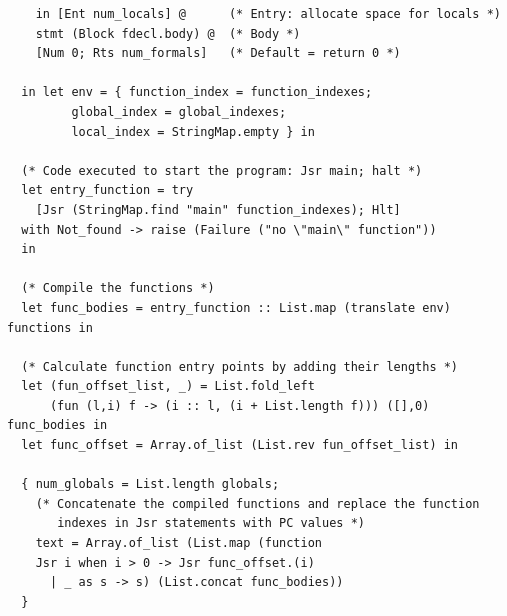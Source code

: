 \documentclass[12pt,A4]{book}
\begin{document}
\begin{verbatim}
    in [Ent num_locals] @      (* Entry: allocate space for locals *)
    stmt (Block fdecl.body) @  (* Body *)
    [Num 0; Rts num_formals]   (* Default = return 0 *)

  in let env = { function_index = function_indexes;
		 global_index = global_indexes;
		 local_index = StringMap.empty } in

  (* Code executed to start the program: Jsr main; halt *)
  let entry_function = try
    [Jsr (StringMap.find "main" function_indexes); Hlt]
  with Not_found -> raise (Failure ("no \"main\" function"))
  in
    
  (* Compile the functions *)
  let func_bodies = entry_function :: List.map (translate env) functions in

  (* Calculate function entry points by adding their lengths *)
  let (fun_offset_list, _) = List.fold_left
      (fun (l,i) f -> (i :: l, (i + List.length f))) ([],0) func_bodies in
  let func_offset = Array.of_list (List.rev fun_offset_list) in

  { num_globals = List.length globals;
    (* Concatenate the compiled functions and replace the function
       indexes in Jsr statements with PC values *)
    text = Array.of_list (List.map (function
	Jsr i when i > 0 -> Jsr func_offset.(i)
      | _ as s -> s) (List.concat func_bodies))
  }
\end{verbatim}
\end{document}
